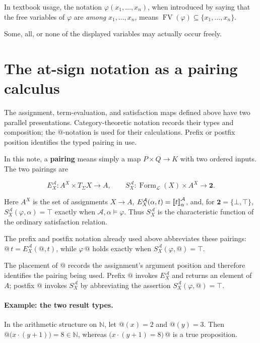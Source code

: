 \documentclass[11pt]{article}
\makeatletter
\newcommand{\llbracket}{\mathopen{[\mkern-3mu[}}
\newcommand{\rrbracket}{\mathclose{]\mkern-3mu]}}
\newcommand{\atsign}{\mathord{@}}
\makeatother
\begin{document}
In textbook usage, the notation \(\varphi(x_1,\ldots,x_n)\), when introduced
by saying that the free variables of \(\varphi\) are \emph{among}
\(x_1,\ldots,x_n\), means
\(\operatorname{FV}(\varphi)\subseteq\{x_1,\ldots,x_n\}\).

Some, all, or none of the displayed variables may actually occur freely.

\section{The at-sign notation as a pairing calculus}
\label{at-sign-pairing-calculus}

The assignment, term-evaluation, and satisfaction maps defined above have two
parallel presentations. Category-theoretic notation records their types and
composition; the $\atsign$-notation is used for their calculations. Prefix or
postfix position identifies the typed pairing in use.

In this note, a \textbf{pairing} means simply a map $P\times Q\to K$ with two
ordered inputs. The two pairings are

\[
E_X^{\mathcal A}:A^X\times T_\Sigma X\longrightarrow A,
\qquad
S_X^{\mathcal A}:
\operatorname{Form}_{\mathcal L}(X)\times A^X
\longrightarrow\mathbf 2.
\]

Here $A^X$ is the set of assignments $X\to A$,
$E_X^{\mathcal A}(\alpha,t)=\llbracket t\rrbracket^{\mathcal A}_\alpha$,
and, for $\mathbf 2=\{\bot,\top\}$,
$S_X^{\mathcal A}(\varphi,\alpha)=\top$ exactly when
$\mathcal A,\alpha\models\varphi$. Thus $S_X^{\mathcal A}$ is the
characteristic function of the ordinary satisfaction relation.

The prefix and postfix notation already used above abbreviates these pairings:
$\atsign\,t=E_X^{\mathcal A}(\atsign,t)$, while
$\varphi\,\atsign$ holds exactly when
$S_X^{\mathcal A}(\varphi,\atsign)=\top$.

The placement of $\atsign$ records the assignment's argument position and
therefore identifies the pairing being used. Prefix $\atsign$ invokes
$E_X^{\mathcal A}$ and returns an element of $A$; postfix $\atsign$ invokes
$S_X^{\mathcal A}$ by abbreviating the assertion
$S_X^{\mathcal A}(\varphi,\atsign)=\top$.

\paragraph{Example: the two result types.}
In the arithmetic structure on \(\mathbb N\), let \(\atsign(x)=2\) and
\(\atsign(y)=3\). Then \(\atsign\bigl(x\cdot(y+1)\bigr)=8\in\mathbb N\),
whereas \(\bigl(x\cdot(y+1)=8\bigr)\,\atsign\) is a true proposition.
\end{document}
